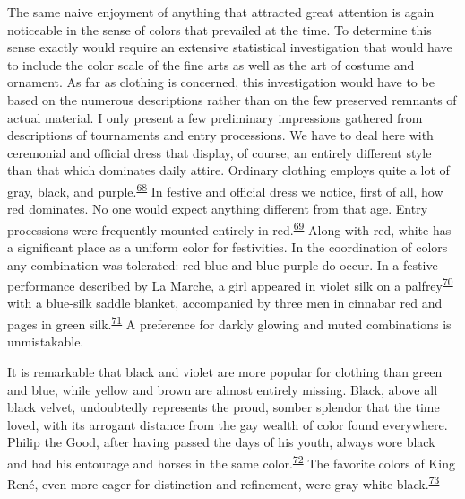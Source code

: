 The same naive enjoyment of anything that attracted great attention is
again noticeable in the sense of colors that prevailed at the time. To
determine this sense exactly would require an extensive statistical
investigation that would have to include the color scale of the fine
arts as well as the art of costume and ornament. As far as clothing is
concerned, this investigation would have to be based on the numerous
descriptions rather than on the few preserved remnants of actual
material. I only present a few preliminary impressions gathered from
descriptions of tournaments and entry processions. We have to deal here
with ceremonial and official dress that display, of course, an entirely
different style than that which dominates daily attire. Ordinary
clothing employs quite a lot of gray, black, and
purple.\textsuperscript{\protect\hypertarget{20_ILLUSTRATIONS_FOLLOW_PAGE.xhtmlux5cux23id_338}{\protect\hyperlink{23_NOTES.xhtmlux5cux23id_339}{68}}}
In festive and official dress we notice, first of all, how red
dominates. No one would expect anything different from that age. Entry
processions were frequently mounted entirely in
red.\textsuperscript{\protect\hypertarget{20_ILLUSTRATIONS_FOLLOW_PAGE.xhtmlux5cux23id_336}{\protect\hyperlink{23_NOTES.xhtmlux5cux23id_337}{69}}}
Along with red, white has a significant place as a uniform color for
festivities. In the coordination of colors any combination was
tolerated: red-blue and blue-purple do occur. In a festive performance
described by La Marche, a girl appeared in violet silk on a
palfrey\textsuperscript{\protect\hypertarget{20_ILLUSTRATIONS_FOLLOW_PAGE.xhtmlux5cux23id_334}{\protect\hyperlink{23_NOTES.xhtmlux5cux23id_335}{70}}}
with a blue-silk saddle blanket, accompanied by three men in cinnabar
red and pages in green
silk.\textsuperscript{\protect\hypertarget{20_ILLUSTRATIONS_FOLLOW_PAGE.xhtmlux5cux23id_332}{\protect\hyperlink{23_NOTES.xhtmlux5cux23id_333}{71}}}
A preference for darkly glowing and muted combinations is unmistakable.

\protect\hypertarget{20_ILLUSTRATIONS_FOLLOW_PAGE.xhtmlux5cux23page_326}{}{}It
is remarkable that black and violet are more popular for clothing than
green and blue, while yellow and brown are almost entirely missing.
Black, above all black velvet, undoubtedly represents the proud, somber
splendor that the time loved, with its arrogant distance from the gay
wealth of color found everywhere. Philip the Good, after having passed
the days of his youth, always wore black and had his entourage and
horses in the same
color.\textsuperscript{\protect\hypertarget{20_ILLUSTRATIONS_FOLLOW_PAGE.xhtmlux5cux23id_330}{\protect\hyperlink{23_NOTES.xhtmlux5cux23id_331}{72}}}
The favorite colors of King René, even more eager for distinction and
refinement, were
gray-white-black.\textsuperscript{\protect\hypertarget{20_ILLUSTRATIONS_FOLLOW_PAGE.xhtmlux5cux23id_328}{\protect\hyperlink{23_NOTES.xhtmlux5cux23id_329}{73}}}

